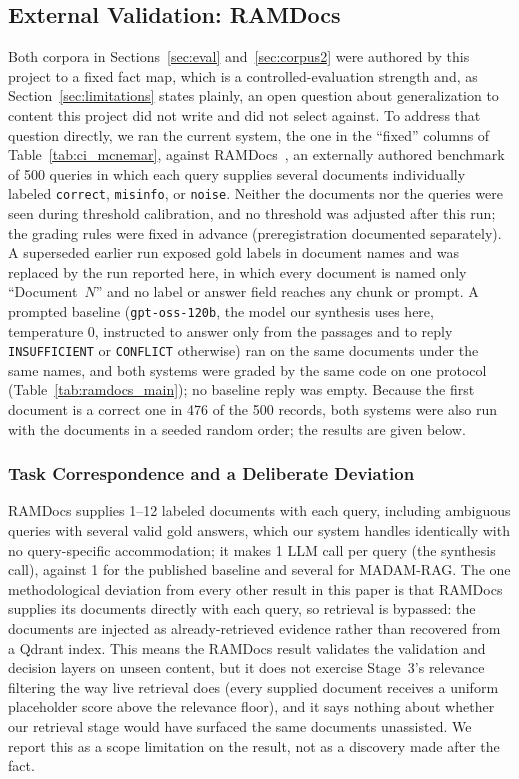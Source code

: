 \documentclass[conference]{IEEEtran}
\begin{document}
\subsection{External Validation: RAMDocs}
\label{sec:ramdocs}
Both corpora in Sections~\ref{sec:eval} and~\ref{sec:corpus2} were authored by
this project to a fixed fact map, which is a controlled-evaluation strength
and, as Section~\ref{sec:limitations} states plainly, an open question about
generalization to content this project did not write and did not select
against. To address that question directly, we ran the current system,
the one in the ``fixed'' columns of Table~\ref{tab:ci_mcnemar}, against
RAMDocs~\cite{wang2025ramdocs}, an externally authored benchmark of 500
queries in which each query supplies several documents individually labeled
\texttt{correct}, \texttt{misinfo}, or \texttt{noise}. Neither the documents
nor the queries were seen during threshold calibration, and no threshold was
adjusted after this run; the grading rules were fixed in advance
(preregistration documented separately). A superseded earlier run exposed
gold labels in document names and was replaced by the run reported here, in
which every document is named only ``Document~$N$'' and no label or answer
field reaches any chunk or prompt. A prompted baseline (\texttt{gpt-oss-120b},
the model our synthesis uses here, temperature 0, instructed to answer only
from the passages and to reply \texttt{INSUFFICIENT} or \texttt{CONFLICT}
otherwise) ran on the same documents under the same names, and both systems
were graded by the same code on one protocol (Table~\ref{tab:ramdocs_main});
no baseline reply was empty. Because the first document is a correct one in
476 of the 500 records, both systems were also run with the documents in a
seeded random order; the results are given below.

\subsubsection{Task Correspondence and a Deliberate Deviation}
RAMDocs supplies 1--12 labeled documents with each query, including
ambiguous queries with several valid gold answers, which our system handles
identically with no query-specific accommodation; it makes 1 LLM call per
query (the synthesis call), against 1 for the published baseline and
several for MADAM-RAG. The one methodological deviation from every other result in this paper is that
RAMDocs supplies its documents directly with each query, so retrieval is
bypassed: the documents are injected as already-retrieved evidence rather
than recovered from a Qdrant index. This means the RAMDocs result validates
the validation and decision layers on unseen content, but it does not
exercise Stage~3's relevance filtering the way live retrieval does (every
supplied document receives a uniform placeholder score above the relevance
floor), and it says nothing about whether our retrieval stage would have
surfaced the same documents unassisted. We report this as a scope
limitation on the result, not as a discovery made after the fact.
\end{document}
